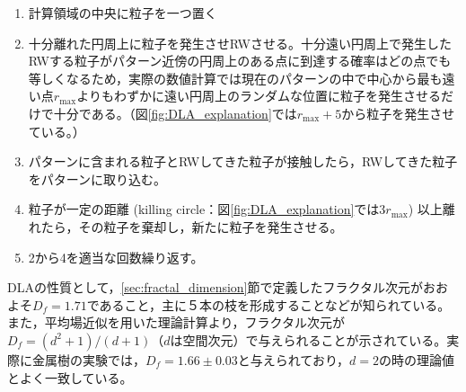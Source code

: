 \documentclass[autodetect-engine,dvi=dvipdfmx,a4paper,ja=standard,oneside,openany]{bxjsbook}
\begin{document}
\begin{enumerate}
  \item 計算領域の中央に粒子を一つ置く
  \item 十分離れた円周上に粒子を発生させRWさせる。十分遠い円周上で発生したRWする粒子がパターン近傍の円周上のある点に到達する確率はどの点でも等しくなるため，実際の数値計算では現在のパターンの中で中心から最も遠い点$r_\mathrm{max}$よりもわずかに遠い円周上のランダムな位置に粒子を発生させるだけで十分である。（図\ref{fig:DLA_explanation}では$r_{\mathrm{max}}+5$から粒子を発生させている。）
  \item パターンに含まれる粒子とRWしてきた粒子が接触したら，RWしてきた粒子をパターンに取り込む。
  \item 粒子が一定の距離 (killing circle：図\ref{fig:DLA_explanation}では$3r_{\mathrm{max}}$) 以上離れたら，その粒子を棄却し，新たに粒子を発生させる。
  \item 2から4を適当な回数繰り返す。
\end{enumerate}

DLAの性質として，\ref{sec:fractal_dimension}節で定義したフラクタル次元がおおよそ$D_f=1.71$であること\cite{太田正之輔2009dla}，主に５本の枝を形成することなどが知られている\cite{ohta2004mode}。また，平均場近似を用いた理論計算より，フラクタル次元が$D_f=(d^2+1)/(d+1)$（$d$は空間次元）で与えられる\cite{muthukumar1983mean}\cite{tokuyama1984fractal}ことが示されている。実際に金属樹の実験\cite{matsushita1984fractal}では，$D_f=1.66\pm0.03$と与えられており，$d=2$の時の理論値とよく一致している。

\ifdraft{
  
  
}{}
\end{document}
